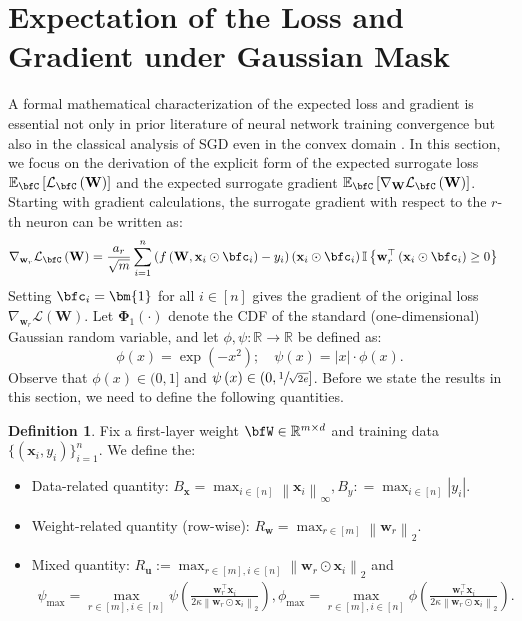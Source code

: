 \documentclass[10pt]{article} %
\theoremstyle{definition}
\newtheorem{definition}[theorem]{Definition}
\theoremstyle{plain}
\newcommand{\paren}[1]{\left(#1\right)}
\newcommand{\norm}[1]{\left\|#1\right\|}
\newcommand{\indy}[1]{\mathbb{I}\left\{#1\right\}}
\providecommand{\E}{\mathbb{E}}
\providecommand{\R}{\mathbb{R}}
\def\calL{{\mathcal{L}}}
\def\bfu{{\mathbf{u}}}\def\bfv{{\mathbf{v}}}\def\bfw{{\mathbf{w}}}\def\bfx{{\mathbf{x}}}
\begin{document}
\section{Expectation of the Loss and Gradient under Gaussian Mask}
\label{sec:surrogate}
A formal mathematical characterization of the expected loss and gradient is essential not only in prior literature of neural network training convergence \citep{liao2022convergence,mianjy2020convergence} but also in the classical analysis of SGD even in the convex domain \citep{shamir2013stochastic,garrigos2023handbook,tang2013convergence}. In this section, we focus on the derivation of the explicit form of the expected surrogate loss $\E_{\bfC}\left[\calL_{\bfC}\paren{\mathbf{W}}\right]$ and the expected surrogate gradient $\E_{\bfC}\left[\nabla_{\mathbf{W}}\calL_{\bfC}\paren{\mathbf{W}}\right]$. 
Starting with gradient calculations, the surrogate gradient with respect to the $r$-th neuron can be written as:
\begin{equation}
    \label{eq:mask_grad}
    \begin{aligned}
        \nabla_{\bfw_r}\calL_{\bfC}\paren{\mathbf{W}} & = \frac{a_r}{\sqrt{m}}\sum_{i=1}^n\paren{f\paren{\mathbf{W},\bfx_i\odot\bfc_i} - y_i} \paren{\bfx_i\odot\bfc_i}\indy{\bfw_r^\top\paren{\bfx_i\odot\bfc_i}\geq 0}
    \end{aligned}
\end{equation}
Setting $\bfc_i = \bm{1}$ for all $i\in[n]$ gives the gradient of the original loss $\nabla_{\bfw_r}\calL\paren{\mathbf{W}}$. Let $\bm{\Phi}_1\paren{\cdot}$ denote the CDF of the standard (one-dimensional) Gaussian random variable, and let $\phi,\psi:\R\rightarrow\R$ be defined as:
\begin{equation}
    \label{eq:phi_psi_defin}
    \phi\paren{x} = \exp\paren{-x^2};\quad \psi\paren{x} = |x| \cdot \phi\paren{x}.
\end{equation}
Observe that $\phi\paren{x}\in (0, 1]$ and $\psi\paren{x} \in\left(0, \sfrac{1}{\sqrt{2e}}\right]$. 
Before we state the results in this section, we need to define the following quantities.
\begin{definition}
    \label{defin:thm_quantities}
    Fix a first-layer weight $\bfW \in \mathbb{R}^{m \times d}$ and training data $\{\paren{\bfx_i, y_i}\}_{i=1}^n$. We define the:
    \begin{itemize}[leftmargin=*]
        \item Data-related quantity: $B_{\bfx} = \max_{i\in[n]}\norm{\bfx_i}_{\infty}, B_y : = \max_{i\in[n]}\left|y_i\right|$.
        \item Weight-related quantity (row-wise): $R_{\bfw} = \max_{r\in[m]}\norm{\bfw_r}_2$.
        \item Mixed quantity: $R_{\bfu} := \max_{r\in[m],i\in[n]}\norm{\bfw_r\odot\bfx_i}_2$ and 
        \begin{align*}
            \psi_{\max} = \max_{r\in[m],i\in[n]}\psi\paren{\frac{\bfw_r^\top\bfx_i}{2\kappa\norm{\bfw_r\odot\bfx_i}_2}},  \phi_{\max} = \max_{r\in[m],i\in[n]}\phi\paren{\frac{\bfw_r^\top\bfx_i}{2\kappa\norm{\bfw_r\odot\bfx_i}_2}}.
        \end{align*}
    \end{itemize}
\end{definition}
\end{document}
